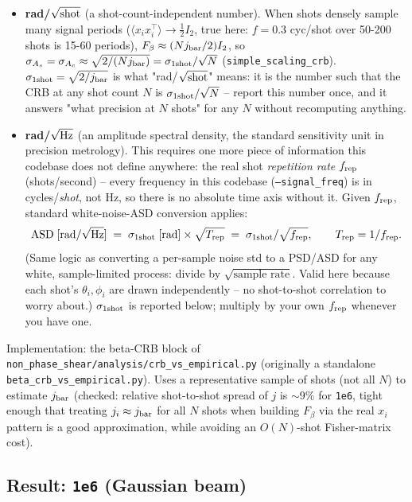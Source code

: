 \documentclass[11pt,a4paper]{article}
\newcommand{\code}[1]{\texttt{#1}}
\begin{document}
\begin{itemize}
  \item \textbf{rad/$\sqrt{\rm shot}$} (a shot-count-independent number).
    When shots densely sample many signal periods ($\langle x_ix_i^\top
    \rangle\to\tfrac12 I_2$, true here: $f=0.3$ cyc/shot over 50-200 shots is
    15-60 periods), $F_\beta\approx(N j_{\rm bar}/2)I_2$, so
    $\sigma_{A_s}=\sigma_{A_c}\approx\sqrt{2/(N j_{\rm bar})} =
    \sigma_{\rm 1shot}/\sqrt N$ (\code{simple\_scaling\_crb}). $\sigma_{\rm
    1shot}=\sqrt{2/j_{\rm bar}}$ is what "rad/$\sqrt{\rm shot}$" means: it is
    the number such that the CRB at any shot count $N$ is
    $\sigma_{\rm 1shot}/\sqrt N$ -- report this number once, and it answers
    "what precision at $N$ shots" for any $N$ without recomputing anything.
  \item \textbf{rad/$\sqrt{\rm Hz}$} (an amplitude spectral density, the
    standard sensitivity unit in precision metrology). This requires one
    more piece of information this codebase does not define anywhere: the
    real shot \emph{repetition rate} $f_{\rm rep}$ (shots/second) -- every
    frequency in this codebase (\code{--signal\_freq}) is in
    cycles/\emph{shot}, not Hz, so there is no absolute time axis without
    it. Given $f_{\rm rep}$, standard white-noise-ASD conversion applies:
    \[
      {\rm ASD} \;[{\rm rad}/\sqrt{\rm Hz}] \;=\; \sigma_{\rm 1shot}\;[{\rm
      rad}] \times \sqrt{T_{\rm rep}} \;=\; \sigma_{\rm 1shot} /
      \sqrt{f_{\rm rep}},\qquad T_{\rm rep}=1/f_{\rm rep}.
    \]
    (Same logic as converting a per-sample noise std to a PSD/ASD for any
    white, sample-limited process: divide by $\sqrt{\text{sample rate}}$.
    Valid here because each shot's $\theta_i,\phi_i$ are drawn independently
    -- no shot-to-shot correlation to worry about.) $\sigma_{\rm 1shot}$ is
    reported below; multiply by your own $f_{\rm rep}$ whenever you have
    one.
\end{itemize}

Implementation: the beta-CRB block of
\code{non\_phase\_shear/analysis/crb\_vs\_empirical.py} (originally a
standalone \code{beta\_crb\_vs\_empirical.py}). Uses a
representative sample of shots (not all $N$) to estimate $j_{\rm bar}$
(checked: relative shot-to-shot spread of $j$ is $\sim$9\% for \code{1e6},
tight enough that treating $j_i\approx j_{\rm bar}$ for all $N$ shots when
building $F_\beta$ via the real $x_i$ pattern is a good approximation, while
avoiding an $O(N)$-shot Fisher-matrix cost).

\subsection{Result: \code{1e6} (Gaussian beam)}
\label{sec:beta-1e6}
\end{document}
